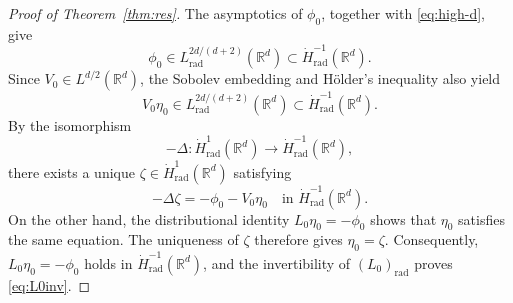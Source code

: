 \documentclass[12pt, a4paper, reqno]{amsart}
\numberwithin{equation}{section}
\theoremstyle{definition}
\theoremstyle{remark}
\newcommand{\R}{\mathbb R}
\newcommand{\rad}{\mathrm{rad}}
\begin{document}
\begin{proof}[Proof of Theorem~\ref{thm:res}]
The asymptotics of $\phi_0$, together with \eqref{eq:high-d}, give
\[
  \phi_0\in L^{2d/(d+2)}_{\rad}(\R^d)
  \subset\dot H^{-1}_{\rad}(\R^d).
\]
Since $V_0\in L^{d/2}(\R^d)$, the Sobolev embedding and H\"older's
inequality also yield
\[
  V_0\eta_0\in L^{2d/(d+2)}_{\rad}(\R^d)
  \subset\dot H^{-1}_{\rad}(\R^d).
\]
By the isomorphism
\[
  -\Delta\colon
  \dot H^1_{\rad}(\R^d)
  \to
  \dot H^{-1}_{\rad}(\R^d),
\]
there exists a unique $\zeta\in\dot H^1_{\rad}(\R^d)$ satisfying
\[
  -\Delta\zeta=-\phi_0-V_0\eta_0
  \quad\text{in }\dot H^{-1}_{\rad}(\R^d).
\]
On the other hand, the distributional identity
$L_0\eta_0=-\phi_0$ shows that $\eta_0$ satisfies the same equation.
The uniqueness of $\zeta$ therefore gives $\eta_0=\zeta$. Consequently,
$L_0\eta_0=-\phi_0$ holds in $\dot H^{-1}_{\rad}(\R^d)$, and the
invertibility of $(L_0)_{\rad}$ proves \eqref{eq:L0inv}.


%


\end{proof}
\end{document}
